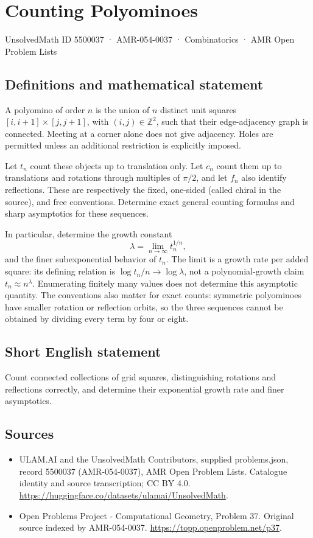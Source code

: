 \documentclass[11pt,a4paper]{article}
\begin{document}
\section*{Counting Polyominoes}\label{5500037}
{\small UnsolvedMath ID 5500037 · AMR-054-0037 · Combinatorics · AMR Open Problem Lists}
\subsection{Definitions and mathematical statement}
A polyomino of order $n$ is the union of $n$ distinct unit squares
$[i,i+1]\times[j,j+1]$, with $(i,j)\in\mathbb Z^2$, such that their
edge-adjacency graph is connected. Meeting at a corner alone does not
give adjacency. Holes are permitted unless an additional restriction
is explicitly imposed.

Let $t_n$ count these objects up to translation only. Let $c_n$ count
them up to translations and rotations through multiples of $\pi/2$,
and let $f_n$ also identify reflections. These are respectively the
fixed, one-sided (called chiral in the source), and free conventions.
Determine exact general counting formulas and sharp asymptotics for
these sequences.

In particular, determine the growth constant
\[
                  \lambda=\lim_{n\to\infty} t_n^{1/n},
\]
and the finer subexponential behavior of $t_n$. The limit is a growth
rate per added square: its defining relation is
$\log t_n/n\to\log\lambda$, not a polynomial-growth claim
$t_n\approx n^\lambda$.
Enumerating finitely many values does not determine this asymptotic
quantity. The conventions also matter for exact counts: symmetric
polyominoes have smaller rotation or reflection orbits, so the three
sequences cannot be obtained by dividing every term by four or eight.
\subsection{Short English statement}
Count connected collections of grid squares, distinguishing rotations
and reflections correctly, and determine their exponential growth rate
and finer asymptotics.
\subsection{Sources}
\begin{itemize}
\item[S1] ULAM.AI and the UnsolvedMath Contributors, supplied problems.json, record 5500037 (AMR-054-0037), AMR Open Problem Lists. Catalogue identity and source transcription; CC BY 4.0.
\url{https://huggingface.co/datasets/ulamai/UnsolvedMath}.
\item[S2] Open Problems Project - Computational Geometry, Problem 37. Original source indexed by AMR-054-0037.
\url{https://topp.openproblem.net/p37}.
\end{itemize}
\end{document}
